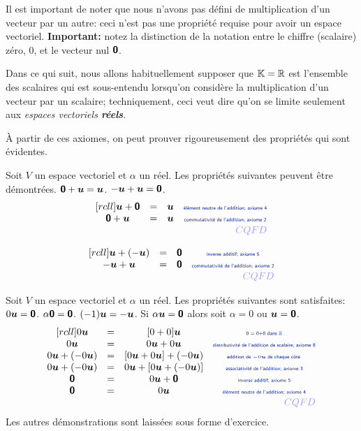 Il est important de noter que nous n'avons pas défini de multiplication d'un vecteur par un autre: ceci n'est
pas une propriété requise pour avoir un espace vectoriel.
\textbf{Important: } notez la distinction de la notation entre le chiffre (scalaire) zéro, 0, et le vecteur nul $\mbox{\textsf{\textbf{{0}}}}$.

Dans ce qui suit, nous allons habituellement supposer que $\mathbb{K}=\mathbb{R}$ est l'ensemble des scalaires qui est sous-entendu lorsqu'on
considère la multiplication d'un vecteur par un scalaire; techniquement, ceci veut dire qu'on se limite seulement
aux \textit{espaces vectoriels \textbf{réels}}.

À partir de ces axiomes, on peut prouver rigoureusement des propriétés qui sont évidentes.
\begin{theo}
Soit $V$ un espace vectoriel et $\alpha$ un réel.  Les propriétés suivantes peuvent être démontrées.
 $\mbox{\textsf{\textbf{{0}}}} + \boldsymbol{u} = \boldsymbol{u}$.
 $-\boldsymbol{u} + \boldsymbol{u} = \mbox{\textsf{\textbf{{0}}}}$.
\proof
{}
\[
\begin{matrix}[rcll]
\mat{u} + \zero &=& \mat{u} & \explain{élément neutre de l'addition; axiome 4} \\
\zero + \mat{u}&=& \mat{u} & \explain{commutativité de l'addition; axiome 2}\\
&&& \cqfd
\end{matrix}
\]

\[
\begin{matrix}[rcll]
\mat{u} + (-\mat{u})  &=& \zero & \explain{inverse additif; axiome 5} \\
-\mat{u} + \mat{u}&=& \zero & \explain{commutativité de l'addition; axiome 2}\\
&&& \cqfd
\end{matrix}
\]
\end{theo}

\begin{theo}
Soit $V$ un espace vectoriel et $\alpha$ un réel.  Les propriétés suivantes sont satisfaites:
 $0\boldsymbol{u} = \mbox{\textsf{\textbf{{0}}}}$.
 $\alpha\mbox{\textsf{\textbf{{0}}}} = \mbox{\textsf{\textbf{{0}}}}$.
 $(-1)\boldsymbol{u} = -\boldsymbol{u}$.
 Si $\alpha\boldsymbol{u} = \mbox{\textsf{\textbf{{0}}}}$ alors soit $\alpha=0$ ou $\boldsymbol{u}=\mbox{\textsf{\textbf{{0}}}}$.
\proof
{}
\[
\begin{matrix}[rcll]
0\mat{u} &=& [0+0]\mat{u} & \explain{0 = 0+0 dans $\BBR$} \\
0\mat{u}&=& 0\mat{u} + 0\mat{u} & \explain{distributivité de l'addition de scalaire; axiome 8}\\
0\mat{u} + (-0\mat{u})&=& [0\mat{u} + 0\mat{u}] + (-0\mat{u})  & \explain{addition de $-0\mat{u}$ de chaque côté.}\\
0\mat{u} + (-0\mat{u})&=& 0\mat{u} + [ 0\mat{u} + (-0\mat{u})] & \explain{associativité de l'addition; axiome 3}\\
\zero &=&  0\mat{u} +\zero &\explain{inverse additif; axiome 5} \\
\zero &=& 0\mat{u} &\explain{élément neutre de l'addition; axiome 4}\\
&&& \cqfd
\end{matrix}
\]
Les autres démonstrations sont laissées sous forme d'exercice.
\end{theo}

